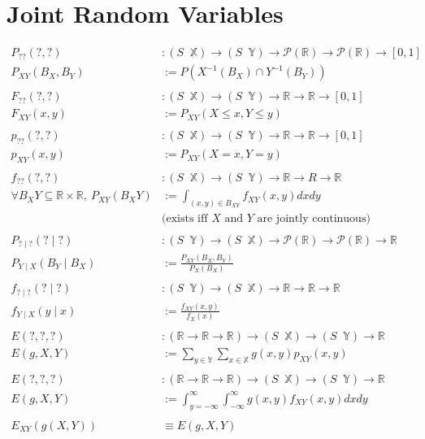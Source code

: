 \documentclass[12pt]{article}
\theoremstyle{definition}
\newcommand{\R}{\mathbb{R}}
\newcommand{\X}{\mathbb{X}}
\newcommand{\Y}{\mathbb{Y}}
\renewcommand{\P}{{\mathcal{P}}}
\DeclareMathOperator{\rvto}{\xrightarrow{RV}}
\DeclareMathOperator{\drvto}{\xrightarrow{DRV}}
\DeclareMathOperator{\crvto}{\xrightarrow{CRV}}
\begin{document}
\section{Joint Random Variables}

\begin{align*}
  P_{??}(?, ?) &: (S \rvto \X) \to (S \rvto \Y) \to \P(\R) \to \P(\R) \to [0, 1]\\
  P_{XY}(B_X, B_Y) &:= P(X^{-1}(B_X) \cap Y^{-1}(B_Y))\\
  \\
  F_{??}(?, ?) &: (S \rvto \X) \to (S \rvto \Y) \to \R \to \R \to [0, 1]\\
  F_{XY}(x, y) &:= P_{XY}(X \leq x, Y \leq y)\\
  \\
  p_{??}(?, ?) &: (S \drvto \X) \to (S \drvto \Y) \to \R \to \R \to [0, 1]\\
  p_{XY}(x, y) &:= P_{XY}(X = x, Y = y)\\
  \\
  f_{??}(?, ?) &: (S \crvto \X) \to (S \crvto \Y) \to \R \to R \to \R\\
  \forall B_XY \subseteq \R \times \R,\ P_{XY}(B_XY) &:= \int_{(x, y) \in B_{XY}}f_{XY}(x, y)dxdy\\
                                                     &\text{(exists iff $X$ and $Y$ are jointly continuous)}\\
  \\
  P_{? \mid ?}(? \mid ?) &: (S \rvto \Y) \to (S \rvto \X) \to \P(\R) \to \P(\R) \to \R\\
  P_{Y \mid X}(B_Y \mid B_X) &:= \frac{P_{XY}(B_X, B_Y)}{P_X(B_X)}\\
  \\
  f_{? \mid ?}(? \mid ?) &: (S \rvto \Y) \to (S \rvto \X) \to \R \to \R \to \R\\
  f_{Y \mid X}(y \mid x) &:= \frac{f_{XY}(x, y)}{f_X(x)}\\
  \\
  E(?, ?, ?) &: (\R \to \R \to \R) \to (S \drvto \X) \to (S \drvto \Y) \to \R\\
  E(g, X, Y) &:= \sum_{y \in \Y}\sum_{x \in \X}g(x, y)p_{XY}(x, y)\\
  \\
  E(?, ?, ?) &: (\R \to \R \to \R) \to (S \crvto \X) \to (S \crvto \Y) \to \R\\
  E(g, X, Y) &:= \int_{y = -\infty}^{\infty}\int_{-\infty}^{\infty}g(x, y)f_{XY}(x, y)dxdy\\
  \\
  E_{XY}(g(X, Y)) &\equiv E(g, X, Y)\\
\end{align*}
\end{document}
